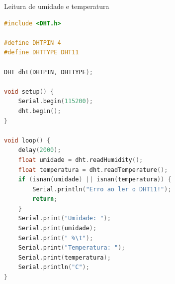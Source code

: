 \begin{frame}[fragile]{Leitura de umidade e temperatura}
\begin{lstlisting}[language=C, basicstyle=\tiny\ttfamily]
#include <DHT.h>

#define DHTPIN 4        
#define DHTTYPE DHT11

DHT dht(DHTPIN, DHTTYPE);

void setup() {
    Serial.begin(115200);
    dht.begin();
}

void loop() {
    delay(2000);
    float umidade = dht.readHumidity();
    float temperatura = dht.readTemperature();
    if (isnan(umidade) || isnan(temperatura)) {
        Serial.println("Erro ao ler o DHT11!");
        return;
    }
    Serial.print("Umidade: ");
    Serial.print(umidade);
    Serial.print(" %\t");
    Serial.print("Temperatura: ");
    Serial.print(temperatura);
    Serial.println("C");
}
    
\end{lstlisting}
\end{frame}

